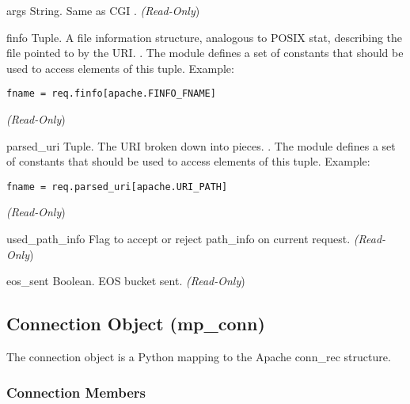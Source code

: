 \begin{memberdesc}[Request]{args}
String. Same as CGI .
\emph{(Read-Only})
\end{memberdesc}

\begin{memberdesc}[Request]{finfo}
Tuple. A file information structure, analogous to POSIX stat,
describing the file pointed to by the URI.  . The  module defines a set of 
constants that should be used to access elements of this
tuple. Example:
\begin{verbatim}
fname = req.finfo[apache.FINFO_FNAME]
\end{verbatim}
\emph{(Read-Only})
\end{memberdesc}

\begin{memberdesc}[Request]{parsed_uri}
Tuple. The URI broken down into pieces.
. 
The  module defines a set of  constants that
should be used to access elements of this tuple. Example:
\begin{verbatim}
fname = req.parsed_uri[apache.URI_PATH]
\end{verbatim}
\emph{(Read-Only})
\end{memberdesc}

\begin{memberdesc}[Request]{used_path_info}
Flag to accept or reject path_info on current request.
\emph{(Read-Only})
\end{memberdesc}

\begin{memberdesc}[Request]{eos_sent}
Boolean. EOS bucket sent.
\emph{(Read-Only})
\end{memberdesc}

\subsection{Connection Object (mp_conn)\label{pyapi-mpconn}}

The connection object is a Python mapping to the Apache conn_rec
structure.

\subsubsection{Connection Members\label{pyapi-mpconn-mem}}

